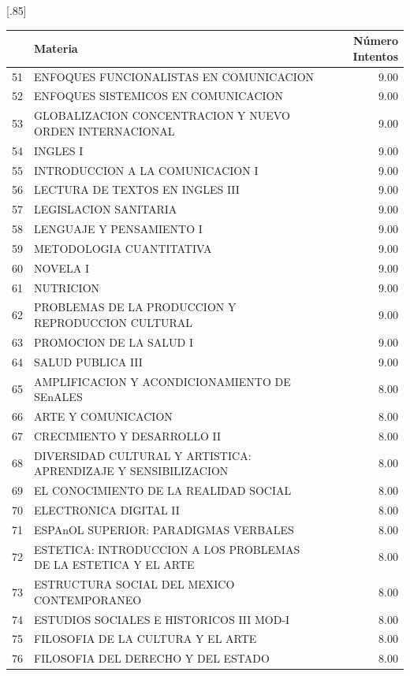 \documentclass[12pt]{article}
\begin{document}
\begin{table}[ht]
\centering
\scalebox{0.75}[.85]{
\begin{tabular}{rlr}
  \hline
 & Materia & N\'umero Intentos  \\ 
  \hline
  51 & ENFOQUES FUNCIONALISTAS EN COMUNICACION & 9.00 \\ 
  52 & ENFOQUES SISTEMICOS EN COMUNICACION & 9.00 \\ 
  53 & GLOBALIZACION CONCENTRACION Y NUEVO ORDEN INTERNACIONAL & 9.00 \\ 
   54 & INGLES I & 9.00 \\ 
  55 & INTRODUCCION A LA COMUNICACION I & 9.00 \\ 
  56 & LECTURA DE TEXTOS EN INGLES III & 9.00 \\ 
  57 & LEGISLACION SANITARIA & 9.00 \\ 
  58 & LENGUAJE Y PENSAMIENTO I & 9.00 \\ 
  59 & METODOLOGIA CUANTITATIVA & 9.00 \\ 
  60 & NOVELA I & 9.00 \\ 
  61 & NUTRICION & 9.00 \\ 
  62 & PROBLEMAS DE LA PRODUCCION Y REPRODUCCION CULTURAL & 9.00 \\ 
  63 & PROMOCION DE LA SALUD I & 9.00 \\ 
  64 & SALUD PUBLICA III & 9.00 \\ 
  65 & AMPLIFICACION Y ACONDICIONAMIENTO DE SEnALES & 8.00 \\ 
  66 & ARTE Y COMUNICACION & 8.00 \\ 
  67 & CRECIMIENTO Y DESARROLLO II & 8.00 \\ 
  68 & DIVERSIDAD CULTURAL Y ARTISTICA: APRENDIZAJE Y SENSIBILIZACION & 8.00 \\ 
  69 & EL CONOCIMIENTO DE LA REALIDAD SOCIAL & 8.00 \\ 
  70 & ELECTRONICA DIGITAL II & 8.00 \\ 
  71 & ESPAnOL SUPERIOR: PARADIGMAS VERBALES & 8.00 \\ 
  72 & ESTETICA: INTRODUCCION A LOS PROBLEMAS DE LA ESTETICA Y EL ARTE & 8.00 \\ 
  73 & ESTRUCTURA SOCIAL DEL MEXICO CONTEMPORANEO & 8.00 \\ 
  74 & ESTUDIOS SOCIALES E HISTORICOS III MOD-I & 8.00 \\ 
  75 & FILOSOFIA DE LA CULTURA Y EL ARTE & 8.00 \\ 
  76 & FILOSOFIA DEL DERECHO Y DEL ESTADO & 8.00 \\ 

\end{tabular}}
\end{table}
\end{document}
